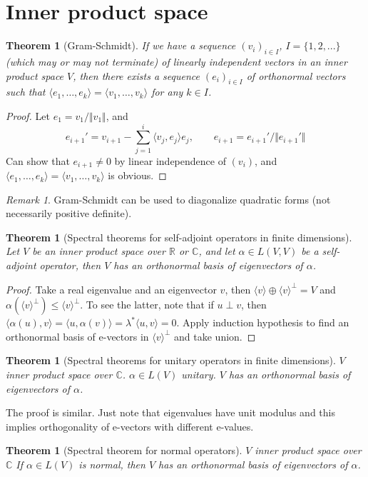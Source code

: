\documentclass{article}
\theoremstyle{definition}
\theoremstyle{remark}
\newtheorem{rem}{Remark}
\theoremstyle{plain}
\newtheorem{thm}[defn]{Theorem}
\newcommand{\RR}{\mathbb{R}}
\newcommand{\CC}{\mathbb{C}}
\begin{document}
\section{Inner product space}
\begin{thm}[Gram-Schmidt]
    If we have a sequence $(v_i)_{i\in I}$, $I=\{1,2,...\}$ (which may or may not terminate) of linearly independent vectors in an inner product space $V$, then there exists a sequence $(e_i)_{i\in I}$ of orthonormal vectors such that $\langle e_1,\ldots,e_k\rangle=\langle v_1,\ldots, v_k\rangle$ for any $k\in I$.
\end{thm}
\begin{proof}
    Let $e_1=v_1/\Vert v_1\Vert$, and
    \[e_{i+1}'=v_{i+1}-\sum_{j=1}^i\langle v_j,e_j\rangle e_j,\text{ }\text{ }\text{ }e_{i+1}=e_{i+1}'/\Vert e_{i+1}'\Vert\]
    Can show that $e_{i+1}\neq 0$ by linear independence of $(v_i)$, and $\langle e_1,\ldots,e_k\rangle=\langle v_1,\ldots, v_k\rangle$ is obvious.
\end{proof}
\begin{rem}
    Gram-Schmidt can be used to diagonalize quadratic forms (not necessarily positive definite).
\end{rem}
\begin{thm}[Spectral theorems for self-adjoint operators in finite dimensions]
    Let $V$ be an inner product space over $\RR$ or $\CC$, and let $\alpha\in L(V,V)$ be a self-adjoint operator, then $V$ has an orthonormal basis of eigenvectors of $\alpha$.
\end{thm}
\begin{proof}
Take a real eigenvalue and an eigenvector $v$, then $\langle v\rangle\oplus\langle v\rangle^\perp=V$ and $\alpha(\langle v\rangle^\perp)\le\langle v\rangle ^\perp$. To see the latter, note that if $u\perp v$, then $\langle\alpha(u),v\rangle=\langle u,\alpha(v)\rangle=\lambda^\ast\langle u,v\rangle=0$. Apply induction hypothesis to find an orthonormal basis of e-vectors in $\langle v\rangle^\perp$ and take union.
\end{proof}
\begin{thm}[Spectral theorems for unitary operators in finite dimensions]
$V$ inner product space over $\CC$. $\alpha\in L(V)$ unitary. $V$ has an orthonormal basis of eigenvectors of $\alpha$.    
\end{thm}
The proof is similar. Just note that eigenvalues have unit modulus and this implies orthogonality of e-vectors with different e-values.
\begin{thm}[Spectral theorem for normal operators]
$V$ inner product space over $\CC$
    If $\alpha\in L(V)$ is normal, then $V$ has an orthonormal basis of eigenvectors of $\alpha$.
\end{thm}
\end{document}
